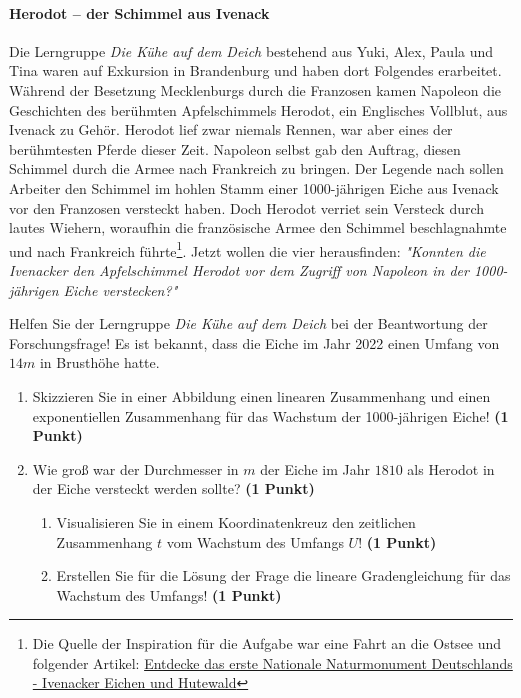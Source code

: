 \documentclass[a4paper, 9pt]{scrartcl}\usepackage[]{graphicx}\usepackage[]{xcolor}
\begin{document}
\paragraph{Herodot – der Schimmel aus Ivenack}
\fi

Die Lerngruppe \textit{Die Kühe auf dem Deich} bestehend aus Yuki, Alex, Paula und Tina waren auf Exkursion in Brandenburg und haben dort Folgendes erarbeitet. Während der Besetzung Mecklenburgs durch die Franzosen kamen Napoleon die Geschichten des berühmten Apfelschimmels Herodot, ein Englisches Vollblut, aus Ivenack zu Gehör. Herodot lief zwar niemals Rennen, war aber eines der berühmtesten Pferde dieser Zeit. Napoleon selbst gab den Auftrag, diesen Schimmel durch die Armee nach Frankreich zu bringen. Der Legende nach sollen Arbeiter den Schimmel im hohlen Stamm einer 1000-jährigen Eiche aus Ivenack vor den Franzosen versteckt haben. Doch Herodot verriet sein Versteck durch lautes Wiehern, woraufhin die französische Armee den Schimmel beschlagnahmte und nach Frankreich führte\footnote{Die Quelle der Inspiration  für die Aufgabe war eine Fahrt an die Ostsee und folgender Artikel:
  \href{https://www.wald-mv.de/landingpage/ivenacker-eichen/}{Entdecke das erste Nationale Naturmonument Deutschlands - Ivenacker Eichen und Hutewald}}. Jetzt wollen die vier herausfinden: \textit{"Konnten die Ivenacker den Apfelschimmel Herodot vor dem Zugriff von Napoleon in der 1000-jährigen Eiche verstecken?"} 



\vspace{1Ex}

Helfen Sie der Lerngruppe \textit{Die Kühe auf dem Deich} bei der Beantwortung der Forschungsfrage! Es ist bekannt, dass die Eiche im Jahr 2022 einen Umfang von $14m$ in Brusthöhe hatte.

\begin{enumerate}
\item Skizzieren Sie in einer Abbildung einen linearen Zusammenhang und einen exponentiellen Zusammenhang für das Wachstum der 1000-jährigen Eiche! \textbf{(1 Punkt)}
\item Wie groß war der Durchmesser in $m$ der Eiche im Jahr $1810$ als Herodot in der Eiche versteckt werden sollte? \textbf{(1 Punkt)}
\begin{enumerate}
\item Visualisieren Sie in einem Koordinatenkreuz den zeitlichen Zusammenhang $t$ vom Wachstum des Umfangs $U$! \textbf{(1 Punkt)}
\item Erstellen Sie für die Lösung der Frage die lineare Gradengleichung für das Wachstum des Umfangs! \textbf{(1 Punkt)}
\end{enumerate}
\end{enumerate}
\end{document}
